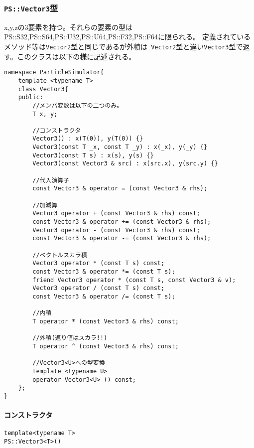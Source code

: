 
\subsubsection{{\tt PS::Vector3}型}

x,y,zの3要素を持つ。それらの要素の型は
{PS::S32},{PS::S64},{PS::U32},{PS::U64},{PS::F32},{PS::F64}に限られる。
定義されているメソッド等は{\tt Vector2}型と同じであるが外積は{\tt
Vector2}型と違い{\tt Vector3}型で返す。このクラスは以下の様に記述される。

\begin{lstlisting}[caption=Vector3]
namespace ParticleSimulator{
    template <typename T>
    class Vector3{
    public:
        //メンバ変数は以下の二つのみ。
        T x, y;

        //コンストラクタ
        Vector3() : x(T(0)), y(T(0)) {}
        Vector3(const T _x, const T _y) : x(_x), y(_y) {}
        Vector3(const T s) : x(s), y(s) {}
        Vector3(const Vector3 & src) : x(src.x), y(src.y) {}

        //代入演算子
        const Vector3 & operator = (const Vector3 & rhs);

        //加減算
        Vector3 operator + (const Vector3 & rhs) const;
        const Vector3 & operator += (const Vector3 & rhs);
        Vector3 operator - (const Vector3 & rhs) const;
        const Vector3 & operator -= (const Vector3 & rhs);

        //ベクトルスカラ積
        Vector3 operator * (const T s) const;
        const Vector3 & operator *= (const T s);
        friend Vector3 operator * (const T s, const Vector3 & v);
        Vector3 operator / (const T s) const;
        const Vector3 & operator /= (const T s);

        //内積
        T operator * (const Vector3 & rhs) const;

        //外積(返り値はスカラ!!)
        T operator ^ (const Vector3 & rhs) const;

        //Vector3<U>への型変換
        template <typename U>
        operator Vector3<U> () const;
    };
}
\end{lstlisting}
\paragraph{コンストラクタ}
\mbox{}
\begin{screen}
\begin{verbatim}
template<typename T>
PS::Vector3<T>()
\end{verbatim}
\end{screen}

